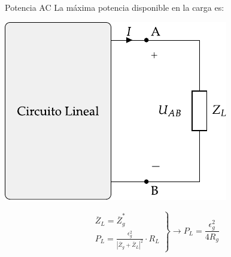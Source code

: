 \documentclass[aspectratio=169, usenames,svgnames,dvipsnames]{beamer}
\begin{document}
\begin{frame}[label={sec:org4893f72}]{Potencia AC}
La máxima potencia disponible en la carga es:
\begin{center}
\includegraphics[height=0.45\textheight]{../figs/EquivalenteThevenin.pdf}
\end{center}

\begin{equation*}
  \left.
    \begin{matrix}
      \overline{Z}_L = \overline{Z}_g^*\\
      P_L = \frac{\epsilon^2_g}{|\overline{Z}_g + \overline{Z}_L|^2} \cdot R_L
    \end{matrix} \right\}\rightarrow
  \boxed{P_L = \frac{\epsilon^2_g}{4 R_g}}
\end{equation*}
\end{frame}
\end{document}
